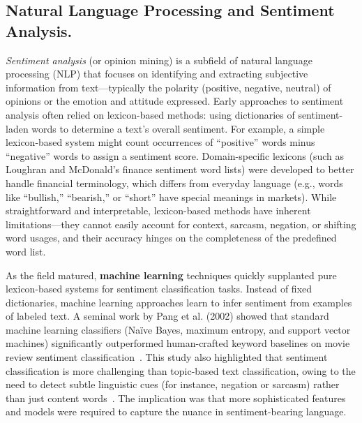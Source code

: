 \documentclass[12pt]{article}
\begin{document}
\subsection{Natural Language Processing and Sentiment Analysis.}
\textit{Sentiment analysis} (or opinion mining) is a subfield of natural language processing (NLP) that
focuses on identifying and extracting subjective information from text---typically the polarity (positive,
negative, neutral) of opinions or the emotion and attitude expressed. Early approaches to sentiment analysis
often relied on lexicon-based methods: using dictionaries of sentiment-laden words to determine a text's
overall sentiment. For example, a simple lexicon-based system might count occurrences of ``positive'' words
minus ``negative'' words to assign a sentiment score. Domain-specific lexicons (such as Loughran and
McDonald's finance sentiment word lists) were developed to better handle financial terminology, which differs
from everyday language (e.g., words like ``bullish,'' ``bearish,'' or ``short'' have special meanings in
markets). While straightforward and interpretable, lexicon-based methods have inherent limitations---they
cannot easily account for context, sarcasm, negation, or shifting word usages, and their accuracy hinges on
the completeness of the predefined word list.

As the field matured, \textbf{machine learning} techniques quickly supplanted pure lexicon-based systems for
sentiment classification tasks. Instead of fixed dictionaries, machine learning approaches learn to infer
sentiment from examples of labeled text. A seminal work by Pang et al. (2002) showed that standard machine
learning classifiers (Naïve Bayes, maximum entropy, and support vector machines) significantly outperformed
human-crafted keyword baselines on movie review sentiment classification~\cite{10.3115/1118693.1118704}. This
study also highlighted that sentiment classification is more challenging than topic-based text
classification, owing to the need to detect subtle linguistic cues (for instance, negation or sarcasm) rather
than just content words~\cite{10.3115/1118693.1118704}. The implication was that more sophisticated features
and models were required to capture the nuance in sentiment-bearing language.
\end{document}
